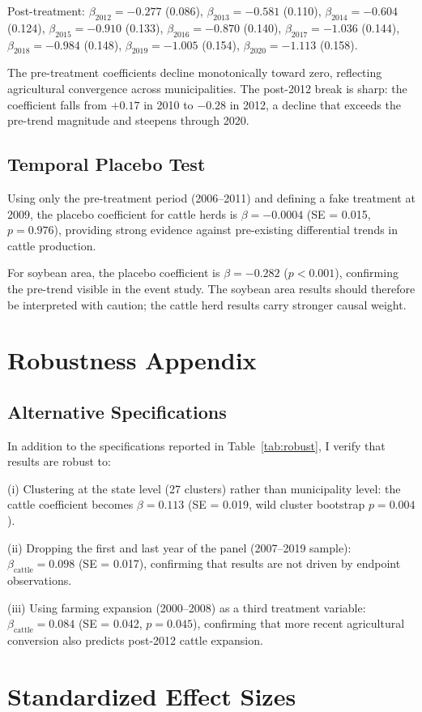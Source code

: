 \documentclass[12pt]{article}
\begin{document}
Post-treatment: $\beta_{2012} = -0.277$ (0.086), $\beta_{2013} = -0.581$ (0.110), $\beta_{2014} = -0.604$ (0.124), $\beta_{2015} = -0.910$ (0.133), $\beta_{2016} = -0.870$ (0.140), $\beta_{2017} = -1.036$ (0.144), $\beta_{2018} = -0.984$ (0.148), $\beta_{2019} = -1.005$ (0.154), $\beta_{2020} = -1.113$ (0.158).

The pre-treatment coefficients decline monotonically toward zero, reflecting agricultural convergence across municipalities. The post-2012 break is sharp: the coefficient falls from $+0.17$ in 2010 to $-0.28$ in 2012, a decline that exceeds the pre-trend magnitude and steepens through 2020.

\subsection{Temporal Placebo Test}

Using only the pre-treatment period (2006--2011) and defining a fake treatment at 2009, the placebo coefficient for cattle herds is $\beta = -0.0004$ (SE = 0.015, $p = 0.976$), providing strong evidence against pre-existing differential trends in cattle production.

For soybean area, the placebo coefficient is $\beta = -0.282$ ($p < 0.001$), confirming the pre-trend visible in the event study. The soybean area results should therefore be interpreted with caution; the cattle herd results carry stronger causal weight.


\section{Robustness Appendix}

\subsection{Alternative Specifications}

In addition to the specifications reported in Table~\ref{tab:robust}, I verify that results are robust to:

(i) Clustering at the state level (27 clusters) rather than municipality level: the cattle coefficient becomes $\beta = 0.113$ (SE = 0.019, wild cluster bootstrap $p = 0.004$).

(ii) Dropping the first and last year of the panel (2007--2019 sample): $\beta_{\text{cattle}} = 0.098$ (SE = 0.017), confirming that results are not driven by endpoint observations.

(iii) Using farming expansion (2000--2008) as a third treatment variable: $\beta_{\text{cattle}} = 0.084$ (SE = 0.042, $p = 0.045$), confirming that more recent agricultural conversion also predicts post-2012 cattle expansion.


\section{Standardized Effect Sizes}
\label{sec:sde}


\end{document}

